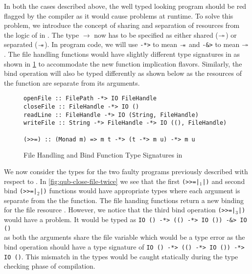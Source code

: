 In both the cases described above, the well typed looking program should be red flagged by the compiler as it would
cause problems at runtime. To solve this problem, we introduce the %
concept of sharing and separation of resources from the logic of \BI{} in \qub. The type $\rightarrow$ now
has to be specified as either shared ($\twoheadrightarrow$) or separated ($\mathrel{-\mkern-6mu*}$). In \qub{} program code, we will use
\texttt{-*>} to mean $\mathrel{-\mkern-6mu*}$ and \texttt{-&>} to mean $\twoheadrightarrow$.
The file handling functions would have slightly different type signatures in \qub{} as shown in \cref{fig:qub-file-handling-functions} to accommodate
the new function implication flavors. Similarly, the bind operation will also be typed differently as shown below as the resources of the function are
separate from its arguments. %

\begin{figure}[h]
  \begin{framed}
    \begin{verbatim}
openFile :: FilePath -*> IO FileHandle
closeFile :: FileHandle -*> IO ()
readLine :: FileHandle -*> IO (String, FileHandle)
writeFile :: String -*> FileHandle -*> IO ((), FileHandle)

(>>=) :: (Monad m) => m t -*> (t -*> m u) -*> m u
    \end{verbatim}
  \end{framed}
  \caption{File Handling and Bind Function Type Signatures in \qub{}}
  \label{fig:qub-file-handling-functions}
\end{figure}

We now consider the types for the two faulty programs previously described with respect to \qub{}.
In \cref{fig:qub-close-file-twice} we see that the first \texttt{(>>=|$_1$|)}
and second bind \texttt{(>>=|$_2$|)} functions would have appropriate types
where each argument is separate from the the function. The file handing functions
return a new binding for the file resource . However, we notice that the third bind operation
\texttt{(>>=|$_3$|)} would have a problem. It  would be typed as
\texttt{IO () -*> (() -*> IO ()) -&> IO ()}\\
as both the arguments share the file variable  which would be a type error
as the bind operation should have a type signature of \texttt{IO () -*> (() -*> IO ()) -*> IO ()}.
This mismatch in the types would be caught statically during the type checking phase of compilation.

